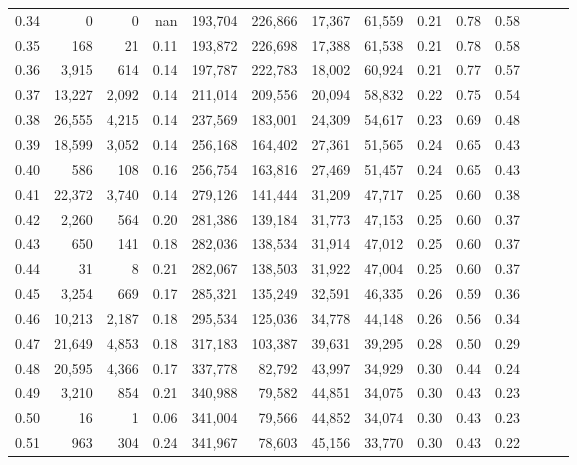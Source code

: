 \begin{tabular}{rrrrrrrrrrrrrr}
0.34 &       0 &      0 &   nan &  193,704 &  226,866 &  17,367 &  61,559 &  0.21 &  0.78 &      0.58 \\
0.35 &     168 &     21 &  0.11 &  193,872 &  226,698 &  17,388 &  61,538 &  0.21 &  0.78 &      0.58 \\
0.36 &   3,915 &    614 &  0.14 &  197,787 &  222,783 &  18,002 &  60,924 &  0.21 &  0.77 &      0.57 \\
0.37 &  13,227 &  2,092 &  0.14 &  211,014 &  209,556 &  20,094 &  58,832 &  0.22 &  0.75 &      0.54 \\
0.38 &  26,555 &  4,215 &  0.14 &  237,569 &  183,001 &  24,309 &  54,617 &  0.23 &  0.69 &      0.48 \\
0.39 &  18,599 &  3,052 &  0.14 &  256,168 &  164,402 &  27,361 &  51,565 &  0.24 &  0.65 &      0.43 \\
0.40 &     586 &    108 &  0.16 &  256,754 &  163,816 &  27,469 &  51,457 &  0.24 &  0.65 &      0.43 \\
0.41 &  22,372 &  3,740 &  0.14 &  279,126 &  141,444 &  31,209 &  47,717 &  0.25 &  0.60 &      0.38 \\
0.42 &   2,260 &    564 &  0.20 &  281,386 &  139,184 &  31,773 &  47,153 &  0.25 &  0.60 &      0.37 \\
0.43 &     650 &    141 &  0.18 &  282,036 &  138,534 &  31,914 &  47,012 &  0.25 &  0.60 &      0.37 \\
0.44 &      31 &      8 &  0.21 &  282,067 &  138,503 &  31,922 &  47,004 &  0.25 &  0.60 &      0.37 \\
0.45 &   3,254 &    669 &  0.17 &  285,321 &  135,249 &  32,591 &  46,335 &  0.26 &  0.59 &      0.36 \\
0.46 &  10,213 &  2,187 &  0.18 &  295,534 &  125,036 &  34,778 &  44,148 &  0.26 &  0.56 &      0.34 \\
0.47 &  21,649 &  4,853 &  0.18 &  317,183 &  103,387 &  39,631 &  39,295 &  0.28 &  0.50 &      0.29 \\
0.48 &  20,595 &  4,366 &  0.17 &  337,778 &   82,792 &  43,997 &  34,929 &  0.30 &  0.44 &      0.24 \\
0.49 &   3,210 &    854 &  0.21 &  340,988 &   79,582 &  44,851 &  34,075 &  0.30 &  0.43 &      0.23 \\
0.50 &      16 &      1 &  0.06 &  341,004 &   79,566 &  44,852 &  34,074 &  0.30 &  0.43 &      0.23 \\
0.51 &     963 &    304 &  0.24 &  341,967 &   78,603 &  45,156 &  33,770 &  0.30 &  0.43 &      0.22 \\

\end{tabular}
